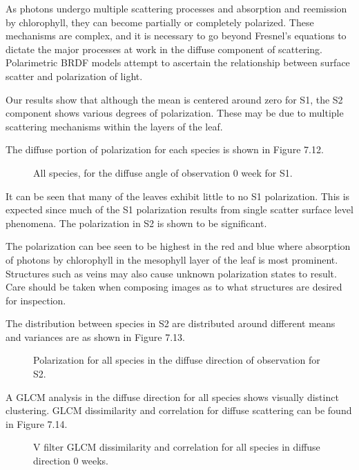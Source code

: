 As photons undergo multiple scattering processes and absorption and reemission by chlorophyll, they can become partially or completely polarized.  These mechanisms are complex, and it is necessary to go beyond Fresnel’s equations to dictate the major processes at work in the diffuse component of scattering.  Polarimetric BRDF models attempt to ascertain the relationship between surface scatter and polarization of light.

Our results show that although the mean is centered around zero for S1, the S2 component shows various degrees of polarization.  These may be due to multiple scattering mechanisms within the layers of the leaf.

The diffuse portion of polarization for each species is shown in Figure 7.12.
%
\begin{figure}[!htb]
    \begin{center}
    \end{center}
    \caption{All species, for the diffuse angle of observation 0 week for S1.}
    \label{fig:polarization}
\end{figure}
%
It can be seen that many of the leaves exhibit little to no S1 polarization.  This is expected since much of the S1 polarization results from single scatter surface level phenomena.  The polarization in S2 is shown to be significant.

The polarization can bee seen to be highest in the red and blue where absorption of photons by chlorophyll in the mesophyll layer of the leaf is most prominent.  Structures such as veins may also cause unknown polarization states to result.  Care should be taken when composing images as to what structures are desired for inspection.

The distribution between species in S2 are distributed around different means and variances are as shown in Figure 7.13.
%
\begin{figure}[!htb]
    \begin{center}
    \end{center}
    \caption{Polarization for all species in the diffuse direction of observation for S2.}
    \label{fig:polarization}
\end{figure}
%
A GLCM analysis in the diffuse direction for all species shows visually distinct clustering.  GLCM dissimilarity and correlation for diffuse scattering can be found in Figure 7.14.
%
\begin{figure}[!htb]
    \begin{center}
    \end{center}
    \caption{V filter GLCM dissimilarity and correlation for all species in diffuse direction 0 weeks.}
    \label{fig:polarization}
\end{figure}
%
